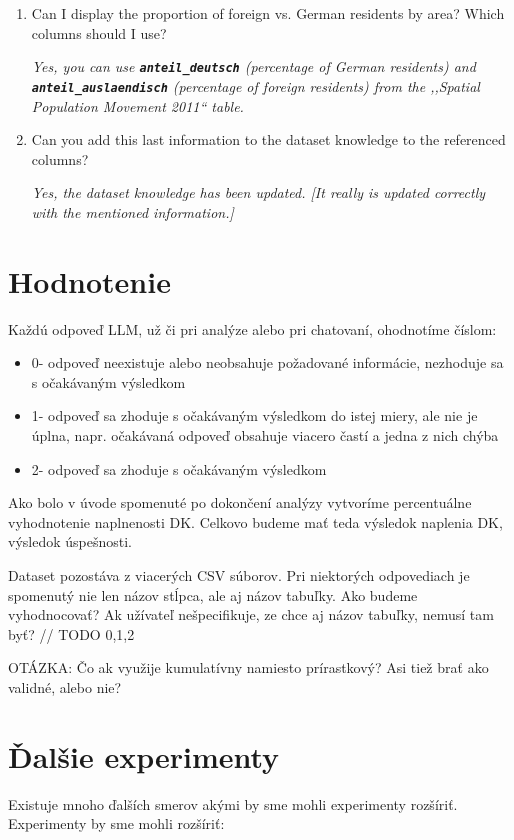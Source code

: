 \begin{enumerate}
\item Can I display the proportion of foreign vs. German residents by area? Which columns should I use?

\textit{Yes, you can use \textbf{\texttt{anteil\_deutsch}} (percentage of German residents) and \textbf{\texttt{anteil\_auslaendisch}} (percentage of foreign residents) from the ,,Spatial Population Movement 2011`` table.}

\item Can you add this last information to the dataset knowledge to the referenced columns?

\textit{Yes, the dataset knowledge has been updated. [It really is updated correctly with the mentioned information.]}
\end{enumerate}

\section{Hodnotenie}

Každú odpoveď LLM, už či pri analýze alebo pri chatovaní, ohodnotíme číslom:
\begin{itemize}
\item 0\-- odpoveď neexistuje alebo neobsahuje požadované informácie, nezhoduje sa s očakávaným výsledkom
\item 1\-- odpoveď sa zhoduje s očakávaným výsledkom do istej miery, ale nie je úplna, napr. očakávaná odpoveď obsahuje viacero častí a jedna z nich chýba
\item 2\-- odpoveď sa zhoduje s očakávaným výsledkom
\end{itemize}

Ako bolo v úvode spomenuté po dokončení analýzy vytvoríme percentuálne vyhodnotenie naplnenosti DK. Celkovo budeme mať teda výsledok naplenia DK, výsledok úspešnosti.

Dataset pozostáva z viacerých CSV súborov. Pri niektorých odpovediach je spomenutý nie len názov stĺpca, ale aj názov tabuľky. Ako budeme vyhodnocovať? Ak užívateľ nešpecifikuje, ze chce aj názov tabuľky, nemusí tam byť?
// TODO 0,1,2

OTÁZKA: Čo ak využije kumulatívny namiesto prírastkový? Asi tiež brať ako validné, alebo nie?


\section{Ďalšie experimenty}

Existuje mnoho ďalších smerov akými by sme mohli experimenty rozšíriť. Experimenty by sme mohli rozšíriť:

